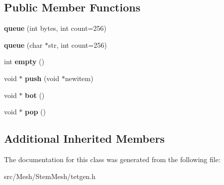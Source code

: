 \subsection*{Public Member Functions}
\begin{DoxyCompactItemize}
\item 
\mbox{\label{classStemMesh3D_1_1tetgenmesh_1_1queue_ab65ecff2fd73d3f7fd223dceed1a2946}} 
{\bfseries queue} (int bytes, int count=256)
\item 
\mbox{\label{classStemMesh3D_1_1tetgenmesh_1_1queue_a356323fdbf2433aac8a79cfc8621699f}} 
{\bfseries queue} (char $\ast$str, int count=256)
\item 
\mbox{\label{classStemMesh3D_1_1tetgenmesh_1_1queue_af35c5ed15086504182e24417f4af759b}} 
int {\bfseries empty} ()
\item 
\mbox{\label{classStemMesh3D_1_1tetgenmesh_1_1queue_a68f8c01a4679af06ea4f00d37f6ee4ec}} 
void $\ast$ {\bfseries push} (void $\ast$newitem)
\item 
\mbox{\label{classStemMesh3D_1_1tetgenmesh_1_1queue_a5e1e1f963ffcf2cede9657c350daeec0}} 
void $\ast$ {\bfseries bot} ()
\item 
\mbox{\label{classStemMesh3D_1_1tetgenmesh_1_1queue_a7007cb39ed4937e670dbc0512842ee13}} 
void $\ast$ {\bfseries pop} ()
\end{DoxyCompactItemize}
\subsection*{Additional Inherited Members}


The documentation for this class was generated from the following file\+:\begin{DoxyCompactItemize}
\item 
src/\+Mesh/\+Stem\+Mesh/tetgen.\+h\end{DoxyCompactItemize}
